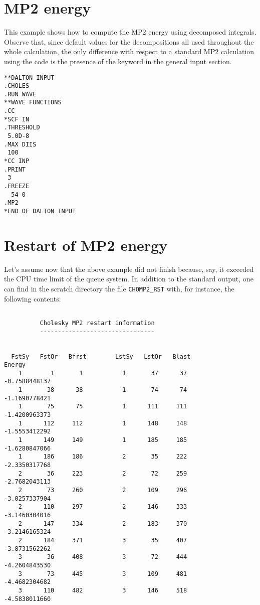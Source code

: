 \section{MP2 energy}
This example shows how to compute the MP2 energy using decomposed integrals. 
Observe that, since default values for the decompositions all used throughout
the whole calculation, the only difference with respect to a standard 
MP2 calculation using the {\cc} code is the presence of the keyword 
 in the  general input section.

\begin{verbatim}
**DALTON INPUT
.CHOLES
.RUN WAVE
**WAVE FUNCTIONS
.CC
*SCF IN
.THRESHOLD
 5.0D-8
.MAX DIIS
 100
*CC INP
.PRINT
 3
.FREEZE
  54 0
.MP2
*END OF DALTON INPUT
\end{verbatim}

\section{Restart of MP2 energy}
Let's assume now that the above example did not finish because, say,
it exceeded the CPU time limit of the queue system. In addition to
the standard output, one can find in the scratch directory the
file \verb|CHOMP2_RST| with, for instance, the following
contents:

\begin{verbatim}

          Cholesky MP2 restart information
          --------------------------------


  FstSy   FstOr   Bfrst        LstSy   LstOr   Blast              Energy
    1        1       1           1       37      37           -0.7588448137
    1       38      38           1       74      74           -1.1690778421
    1       75      75           1      111     111           -1.4200963373
    1      112     112           1      148     148           -1.5553412292
    1      149     149           1      185     185           -1.6280847066
    1      186     186           2       35     222           -2.3350317768
    2       36     223           2       72     259           -2.7682043113
    2       73     260           2      109     296           -3.0257337904
    2      110     297           2      146     333           -3.1460304016
    2      147     334           2      183     370           -3.2146165324
    2      184     371           3       35     407           -3.8731562262
    3       36     408           3       72     444           -4.2604843530
    3       73     445           3      109     481           -4.4682304682
    3      110     482           3      146     518           -4.5838011660
\end{verbatim}


